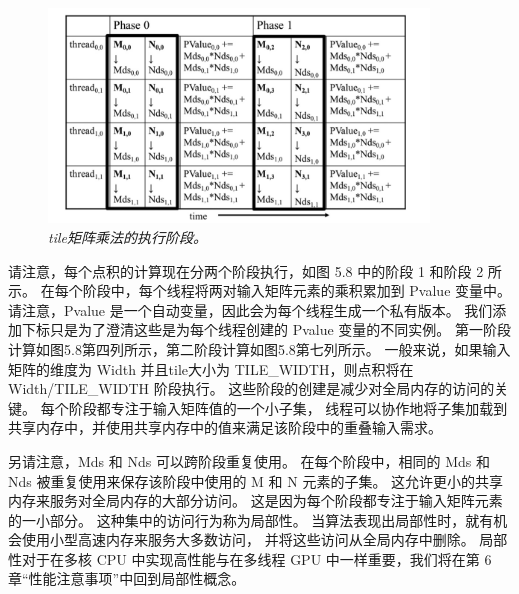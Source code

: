 \begin{figure}[H]
	\centering
	\includegraphics[width=0.9\textwidth]{figs/F5.8.png}
	\caption{\textit{tile矩阵乘法的执行阶段。}}
\end{figure}

请注意，每个点积的计算现在分两个阶段执行，如图 5.8 中的阶段 1 和阶段 2 所示。 
在每个阶段中，每个线程将两对输入矩阵元素的乘积累加到 Pvalue 变量中。 
请注意，Pvalue 是一个自动变量，因此会为每个线程生成一个私有版本。 
我们添加下标只是为了澄清这些是为每个线程创建的 Pvalue 变量的不同实例。 
第一阶段计算如图5.8第四列所示，第二阶段计算如图5.8第七列所示。 
一般来说，如果输入矩阵的维度为 Width 并且tile大小为 TILE\_WIDTH，则点积将在 Width/TILE\_WIDTH 阶段执行。 
这些阶段的创建是减少对全局内存的访问的关键。 每个阶段都专注于输入矩阵值的一个小子集，
线程可以协作地将子集加载到共享内存中，并使用共享内存中的值来满足该阶段中的重叠输入需求。

另请注意，Mds 和 Nds 可以跨阶段重复使用。 
在每个阶段中，相同的 Mds 和 Nds 被重复使用来保存该阶段中使用的 M 和 N 元素的子集。 
这允许更小的共享内存来服务对全局内存的大部分访问。 这是因为每个阶段都专注于输入矩阵元素的一小部分。 
这种集中的访问行为称为局部性。 当算法表现出局部性时，就有机会使用小型高速内存来服务大多数访问，
并将这些访问从全局内存中删除。 
局部性对于在多核 CPU 中实现高性能与在多线程 GPU 中一样重要，我们将在第 6 章“性能注意事项”中回到局部性概念。

